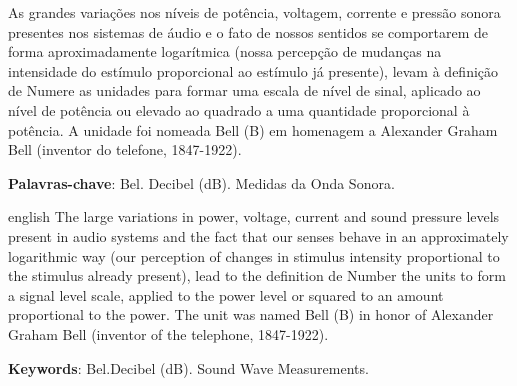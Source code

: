 \documentclass[
	article,			%
	11pt,				%
	oneside,			%
	a4paper,			%
	english,			%
	brazil,				%
	sumario=tradicional
	]{abntex2}
\begin{document}

\frenchspacing 


%
%

\maketitle





\begin{resumoumacoluna}

As grandes variações nos níveis de potência, voltagem, corrente e pressão sonora presentes nos sistemas de áudio e o fato de nossos sentidos se comportarem de forma aproximadamente logarítmica (nossa percepção de mudanças na intensidade do estímulo proporcional ao estímulo já presente), levam à definição de Numere as unidades para formar uma escala de nível de sinal, aplicado ao nível de potência ou elevado ao quadrado a uma quantidade proporcional à potência. A unidade foi nomeada Bell (B) em homenagem a Alexander Graham Bell (inventor do telefone, 1847-1922).

 \noindent
 \textbf{Palavras-chave}: Bel. Decibel (dB). Medidas da Onda Sonora.
\end{resumoumacoluna}


\renewcommand{\resumoname}{Abstract}
\begin{resumoumacoluna}
 \begin{otherlanguage*}{english}
The large variations in power, voltage, current and sound pressure levels present in audio systems and the fact that our senses behave in an approximately logarithmic way (our perception of changes in stimulus intensity proportional to the stimulus already present), lead to the definition de Number the units to form a signal level scale, applied to the power level or squared to an amount proportional to the power. The unit was named Bell (B) in honor of Alexander Graham Bell (inventor of the telephone, 1847-1922).

   \vspace{\onelineskip}
 
   \noindent
   \textbf{Keywords}: Bel.Decibel (dB). Sound Wave Measurements.
 \end{otherlanguage*}  
\end{resumoumacoluna}
\end{document}
